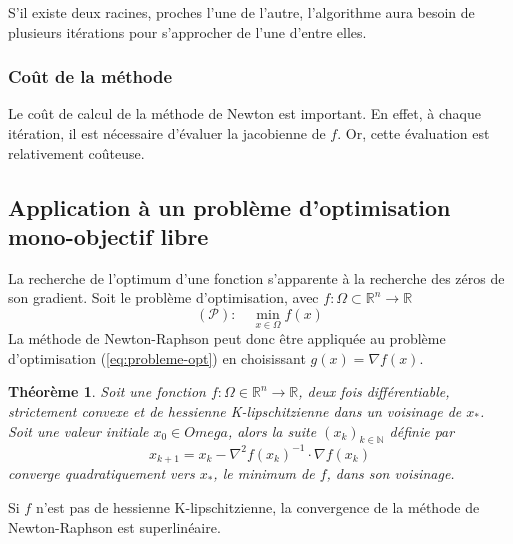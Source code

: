 \documentclass[3p, twocolumn]{elsarticle}
\newtheorem{thm}{Théorème}
\begin{document}
\begin{rmk}
    S'il existe deux racines, proches l'une de l'autre, l'algorithme aura besoin de plusieurs itérations pour s'approcher de l'une d'entre elles.
\end{rmk}

\subsubsection{Coût de la méthode}
Le coût de calcul de la méthode de Newton est important. En effet, à chaque itération, il est nécessaire d’évaluer la jacobienne de $f$. Or, cette évaluation est relativement coûteuse.

\subsection{Application à un problème d'optimisation mono-objectif libre}
La recherche de l'optimum d'une fonction s'apparente à la recherche des zéros de son gradient.
Soit le problème d'optimisation, avec $f:\Omega \subset \mathbb{R}^n \rightarrow \mathbb{R}$
\begin{equation}
    (\mathscr{P}):\quad\min_{x\in \Omega} f(x)
    \label{eq:probleme-opt}
\end{equation}
La méthode de Newton-Raphson peut donc être appliquée au problème d'optimisation (\ref{eq:probleme-opt}) en choisissant $g(x)=\nabla f(x)$.
\begin{thm}
    Soit une fonction $f:\Omega \in \mathbb{R}^n\rightarrow \mathbb{R}$, deux fois différentiable, strictement convexe et de hessienne K-lipschitzienne dans un voisinage de $x_*$. Soit une valeur initiale $x_0\in Omega$, alors la suite $(x_k)_{k\in \mathbb{N}}$ définie par
    \begin{equation}
        x_{k+1}=x_k-\nabla^{2}f(x_k)^{-1}\cdot \nabla f(x_k)
        \label{eq:nr-opt-mono}
    \end{equation}
    converge quadratiquement vers $x_*$, le minimum de $f$, dans son voisinage.
\end{thm}

\begin{rmk}
    Si $f$ n'est pas de hessienne K-lipschitzienne, la convergence de la méthode de Newton-Raphson est superlinéaire.
\end{rmk}
\end{document}
